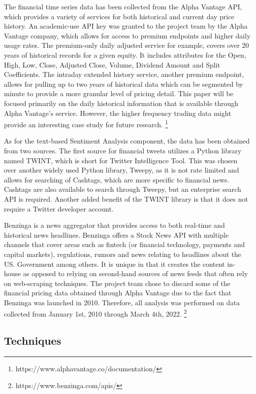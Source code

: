 \documentclass{llncs}
\begin{document}
The financial time series data has been collected from the Alpha Vantage API, which provides a variety of services for both historical and current day price history.  An academic-use API key was granted to the project team by the Alpha Vantage company, which allows for access to premium endpoints and higher daily usage rates. The premium-only daily adjusted service for example, covers over 20 years of historical records for a given equity.  It includes attributes for the Open, High, Low, Close, Adjusted Close, Volume, Dividend Amount and Split Coefficients.  The intraday extended history service, another premium endpoint,  allows for pulling up to two years of historical data which can be segmented by minute to provide a more granular level of pricing detail.  This paper will be focused primarily on the daily historical information that is available through Alpha Vantage's service.  However, the higher frequency trading data might provide an interesting case study for future research.
\footnote{https://www.alphavantage.co/documentation/}

As for the text-based Sentiment Analysis component, the data has been obtained from two sources.  The first source for financial tweets utilizes a Python library named TWINT, which is short for Twitter Intelligence Tool.   This was chosen over another widely used Python library, Tweepy, as it is not rate limited and allows for searching of Cashtags, which are more specific to financial news.  Cashtags are also available to search through Tweepy, but an enterprise search API is required.  Another added benefit of the TWINT library is that it does not require a Twitter developer account.

Benzinga is a news aggregator that provides access to both real-time and historical news headlines.  Benzinga offers a Stock News API with multiple channels that cover areas such as fintech (or financial technology, payments and capital markets), regulations, rumors and news relating to headlines about the US. Government among others.  It is unique in that it creates the content in-house as opposed to relying on second-hand sources of news feeds that often rely on web-scraping techniques.  The project team chose to discard some of the financial pricing data obtained through Alpha Vantage due to the fact that Benzinga was launched in 2010.  Therefore, all analysis was performed on data collected from January 1st, 2010 through March 4th, 2022.  
\footnote{https://www.benzinga.com/apis/}

\subsection{Techniques}
\end{document}
